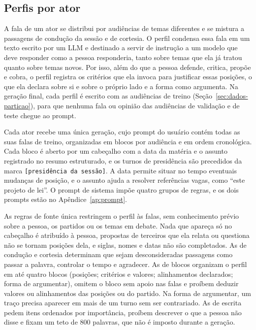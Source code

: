 \subsection{Perfis por ator}
\label{sec:metodo-perfis}

A fala de um ator se distribui por audiências de temas diferentes e se mistura a passagens de
condução da sessão e de cortesia. O perfil condensa essa fala em um texto escrito por um LLM e
destinado a servir de instrução a um modelo que deve responder como a pessoa responderia, tanto sobre
temas que ela já tratou quanto sobre temas novos. Por isso, além do que a pessoa defende, critica,
propõe e cobra, o perfil registra os critérios que ela invoca para justificar essas posições, o que
ela declara sobre si e sobre o próprio lado e a forma como argumenta. Na geração final, cada perfil é
escrito com as audiências de treino (Seção~\ref{sec:dados-particao}), para que nenhuma fala ou
opinião das audiências de validação e de teste chegue ao prompt.

Cada ator recebe uma única geração, cujo prompt do usuário contém todas as suas falas de treino,
organizadas em blocos por audiência e em ordem cronológica. Cada bloco é aberto por um cabeçalho com a
data da matéria e o assunto registrado no resumo estruturado, e os turnos de presidência são
precedidos da marca \texttt{[presidência da sessão]}. A data permite situar no tempo eventuais
mudanças de posição, e o assunto ajuda a resolver referências vagas, como ``este projeto de lei''. O
prompt de sistema impõe quatro grupos de regras, e os dois prompts estão no
Apêndice~\ref{ap:prompt}.

As regras de fonte única restringem o perfil às falas, sem conhecimento prévio sobre a pessoa, os
partidos ou os temas em debate. Nada que apareça só no cabeçalho é atribuído à pessoa, propostas de
terceiros que ela relata ou questiona não se tornam posições dela, e siglas, nomes e datas não são
completados. As de condução e cortesia determinam que sejam desconsideradas passagens como
passar a palavra, controlar o tempo e agradecer. As de blocos organizam o perfil em até quatro blocos (posições;
critérios e valores; alinhamentos declarados; forma de argumentar), omitem o bloco sem apoio nas falas
e proíbem deduzir valores ou alinhamentos das posições ou do partido. Na forma de argumentar, um traço
precisa aparecer em mais de um turno sem ser contrariado. As de escrita pedem itens ordenados por
importância, proíbem descrever o que a pessoa não disse e fixam um teto de 800 palavras, que não é
imposto durante a geração.

